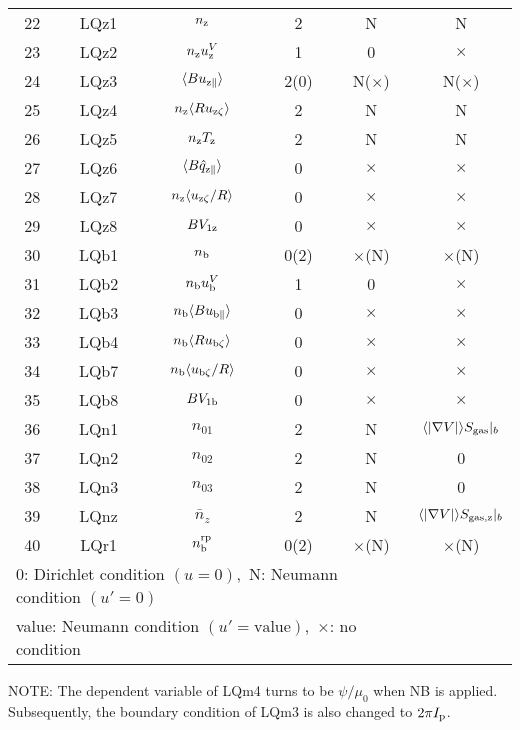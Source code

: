 \documentclass[11pt]{article}
\def\r#1{{\rm#1}}
\def\aves#1{\langle#1\rangle}
\def\para{\parallel}
\def\nz{n_\r{z}}
\def\nb{n_\r{b}}
\def\Tz{T_\r{z}}
\def\uzt#1{u_{\r{#1}\zeta}}
\def\upara#1{u_{\r{#1}\para}}
\def\qhatpara#1{\hat{q}_{\r{#1}\para}}
\def\uV#1{u_\r{#1}^V}
\def\nbrp{n_\r{b}^\r{rp}}
\def\nna{n_{01}}
\def\nnb{n_{02}}
\def\nnc{n_{03}}
\def\nnz{\bar{n}_{z}}
\begin{document}
\begin{tabular}{|c|c|c|c|c|c|}
 22   & LQz1 & $\nz$                  & 2    &  N           & N\\
 23   & LQz2 & $\nz\uV{z}$            & 1    &  0           & $\times$\\
 24   & LQz3 & $\aves{B\upara{z}}$    & 2(0) &  N($\times$) & N($\times$)\\
 25   & LQz4 & $\nz\aves{R\uzt{z}}$   & 2    &  N           & N\\
 26   & LQz5 & $\nz \Tz$              & 2    &  N           & N\\
 27   & LQz6 & $\aves{B\qhatpara{z}}$ & 0    &  $\times$    & $\times$\\
 28   & LQz7 & $\nz\aves{\uzt{z}/R}$  & 0    &  $\times$    & $\times$\\
 29   & LQz8 & $B V_{1\r{z}}$         & 0    &  $\times$    & $\times$\\
 30   & LQb1 & $\nb$                  & 0(2) &  $\times$(N) & $\times$(N)\\
 31   & LQb2 & $\nb\uV{b}$            & 1    &  0           & $\times$\\
 32   & LQb3 & $\nb\aves{B\upara{b}}$ & 0    &  $\times$    & $\times$\\
 33   & LQb4 & $\nb\aves{R\uzt{b}}$   & 0    &  $\times$    & $\times$\\
 34   & LQb7 & $\nb\aves{\uzt{b}/R}$  & 0    &  $\times$    & $\times$\\
 35   & LQb8 & $B V_{1\r{b}}$         & 0    &  $\times$    & $\times$\\
 36   & LQn1 & $\nna$                 & 2    &  N           & $\aves{|\nabla V|}S_\r{gas}|_b$\\
 37   & LQn2 & $\nnb$                 & 2    &  N           & 0\\
 38   & LQn3 & $\nnc$                 & 2    &  N           & 0\\
 39   & LQnz & $\nnz$                 & 2    &  N           & $\aves{|\nabla V|}S_\r{gas,z}|_b$\\
 40   & LQr1 & $\nbrp$                & 0(2) &  $\times$(N) & $\times$(N)\\\hline
 \multicolumn{5}{l}{0: Dirichlet condition $(u=0)$,\ 
                    N: Neumann condition $(u'=0)$}\\
 \multicolumn{5}{l}{value: Neumann condition $(u'=\mbox{value})$,\ 
                    $\times$: no condition}
\end{tabular}
%

\medskip

NOTE: The dependent variable of LQm4 turns to be $\psi/\mu_0$ when NB is
applied. Subsequently, the boundary condition of LQm3 is also changed to
$2\pi I_\r{p}$.
\end{document}
